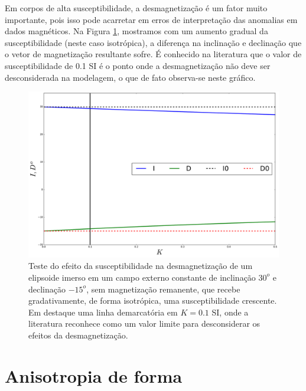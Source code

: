 Em corpos de alta susceptibilidade, a desmagnetização é um fator muito importante, pois isso pode acarretar em erros de interpretação das anomalias em dados magnéticos. Na Figura \ref{fig:test_k_triaxial}, mostramos com um aumento gradual da susceptibilidade (neste caso isotrópica), a diferença na inclinação e declinação que o vetor de magnetização resultante sofre. É conhecido na literatura que o valor de susceptibilidade de 0.1 SI é o ponto onde a desmagnetização não deve ser desconsiderada na modelagem, o que de fato observa-se neste gráfico.

\begin{figure}[hbt!]
	\centering \includegraphics[width=15 cm,height=10 cm]{figures/test_k_triaxial}
	\caption[Teste do efeito da susceptibilidade na desmagnetização de um elipsoide imerso em um campo externo constante de inclinação 
	$30^{o}$ e declinação $-15^{o}$.]{Teste do efeito da susceptibilidade na desmagnetização de um elipsoide imerso em um campo externo constante de inclinação	$30^{o}$ e declinação $-15^{o}$, sem magnetização remanente, que recebe gradativamente, de forma isotrópica,
		uma susceptibilidade crescente. Em destaque uma linha demarcatória em $K=0.1$ SI, onde a literatura reconhece como um valor limite 
		para desconsiderar os efeitos da desmagnetização.}
	\label{fig:test_k_triaxial}
\end{figure}

\section{Anisotropia de forma}

